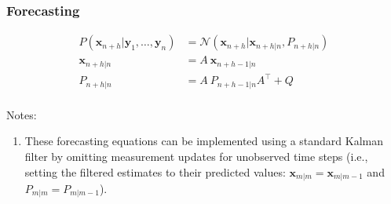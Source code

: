 \begin{frame}                                                                                   
    \frametitle{Forecasting}                                                                     
                                                                                                 
    \begin{align*}                                                                               
        P(\mathbf{x}_{n+h}|\mathbf{y}_1,\ldots,\mathbf{y}_{n})&=\mathcal{N}(\mathbf{x}_{n+h}|\mathbf{x}_{n+h|n},P_{n+h|n})\\
        \mathbf{x}_{n+h|n}&=A\ \mathbf{x}_{n+h-1|n}\\                                             
        P_{n+h|n}&=A\ P_{n+h-1|n}A^\intercal+Q\\                                                  
    \end{align*}                                                                                 
                                                                                                 
    Notes:                                                                                       
                                                                                                 
\begin{enumerate}                                                                               
                                                                                                 
	\item These forecasting equations can be implemented using a standard
Kalman filter by omitting measurement updates for unobserved time steps (i.e.,
setting the filtered estimates to their predicted values: $\mathbf{x}_{m|m} =
\mathbf{x}_{m|m-1}$ and $P_{m|m} = P_{m|m-1}$).  
    
\end{enumerate}
\end{frame}

